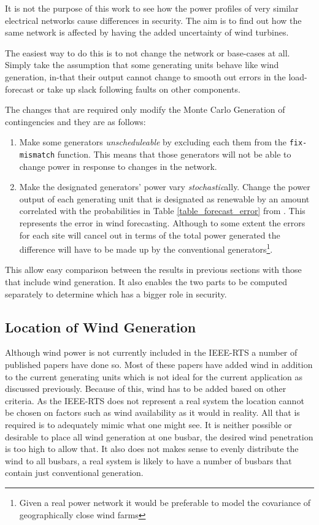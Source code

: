 \documentclass[a4paper,oneside,12pt]{report}
\begin{document}
It is not the purpose of this work to see how the power profiles of very similar electrical networks cause differences in security. The aim is to find out how the same network is affected by having the added uncertainty of wind turbines. 

The easiest way to do this is to not change the network or base-cases at all. Simply take the assumption that some generating units behave like wind generation, in-that their output cannot change to smooth out errors in the load-forecast or take up slack following faults on other components. 

The changes that are required only modify the Monte Carlo Generation of contingencies and they are as follows: 

\begin{enumerate}

\item Make some generators \emph{unscheduleable} by excluding each them from the \texttt{fix-mismatch} function. This means that those generators will not be able to change power in response to changes in the network. 

\item Make the designated generators' power vary \emph{stochastic}ally. Change the power output of each generating unit that is designated as renewable by an amount correlated with the probabilities in Table \ref{table_forecast_error} from \cite{Bathurst2002}. This represents the error in wind forecasting. Although to some extent the errors for each site will cancel out in terms of the total power generated the difference will have to be made up by the conventional generators\footnote{Given a real power network it would be preferable to model the covariance of geographically close wind farms}.

\end{enumerate}

This allow easy comparison between the results in previous sections with those that include wind generation. It also enables the two parts to be computed separately to determine which has a bigger role in security. 

\subsection{Location of Wind Generation}

Although wind power is not currently included in the IEEE-RTS a number of published papers have done so. Most of these papers have added wind in addition to the current generating units which is not ideal for the current application as discussed previously. Because of this, wind has to be added based on other criteria. As the IEEE-RTS does not represent a real system the location cannot be chosen on factors such as wind availability as it would in reality. All that is required is to adequately mimic what one might see. It is neither possible or desirable to place all wind generation at one busbar, the desired wind penetration is too high to allow that. It also does not makes sense to evenly distribute the wind to all busbars, a real system is likely to have a number of busbars that contain just conventional generation.
\end{document}
